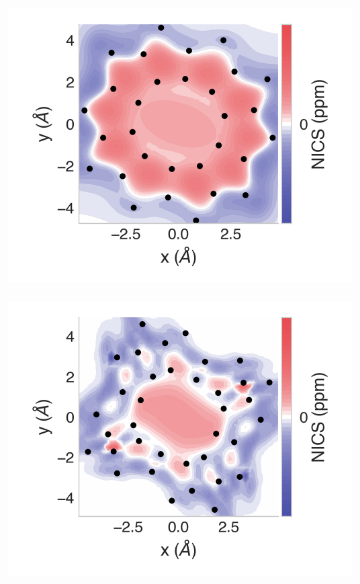 \documentclass[
	fontsize=10pt, %
	twoside=true, %
	numbers=noenddot, %
]{kaobook}
\begin{document}
\begin{figure}[h]
\begin{subfigure}{5.5cm}\centering\includegraphics{p10-2d}\end{subfigure}%
\begin{subfigure}{5.5cm}\centering\includegraphics{p12-2d}\end{subfigure}

\end{figure}
\end{document}
